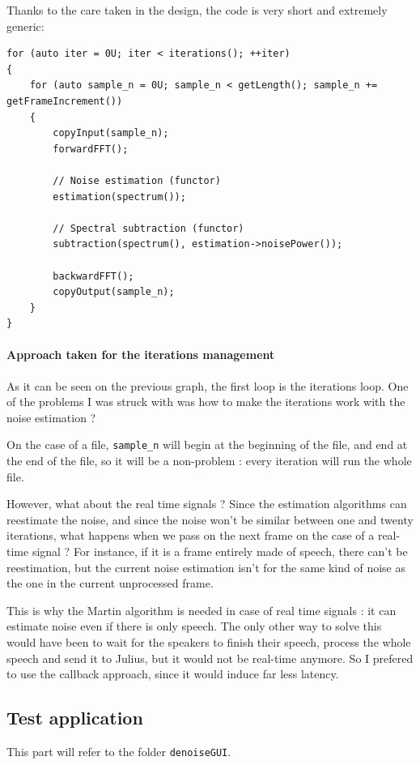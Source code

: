 Thanks to the care taken in the design, the code is very short and extremely generic: 
\begin{lstlisting}[caption=\texttt{SubtractionManager::execute()} in subtraction\_manager.cpp]
for (auto iter = 0U; iter < iterations(); ++iter)
{
	for (auto sample_n = 0U; sample_n < getLength(); sample_n += getFrameIncrement())
	{
		copyInput(sample_n);
		forwardFFT();

		// Noise estimation (functor)
		estimation(spectrum());

		// Spectral subtraction (functor)
		subtraction(spectrum(), estimation->noisePower());

		backwardFFT();
		copyOutput(sample_n);
	}
}
\end{lstlisting}

\paragraph{Approach taken for the iterations management}
As it can be seen on the previous graph, the first loop is the iterations loop. One of the problems I was struck with was how to make the iterations work with the noise estimation ? 

On the case of a file, \texttt{sample\_n} will begin at the beginning of the file, and end at the end of the file, so it will be a non-problem : every iteration will run the whole file.

However, what about the real time signals ?
Since the estimation algorithms can reestimate the noise, and since the noise won't be similar between one and twenty iterations, what happens when we pass on the next frame on the case of a real-time signal ? For instance, if it is a frame entirely made of speech, there can't be reestimation, but the current noise estimation isn't for the same kind of noise as the one in the current unprocessed frame.

This is why the Martin algorithm is needed in case of real time signals : it can estimate noise even if there is only speech. The only other way to solve this would have been to wait for the speakers to finish their speech, process the whole speech and send it to Julius, but it would not be real-time anymore. So I prefered to use the callback approach, since it would induce far less latency.

\subsection{Test application}
This part will refer to the folder \texttt{denoiseGUI}. 
